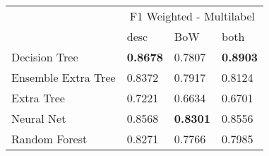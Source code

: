 \begin{tabular}{|l|l|l|l| }
\hline
 &  \multicolumn{3}{c|}{F1 Weighted - Multilabel} \\
\cline{2-4} & desc & BoW & both \\ \hline
Decision Tree       & {\bf 0.8678} & 0.7807 & {\bf 0.8903}\\
Ensemble Extra Tree & 0.8372 & 0.7917 & 0.8124\\
Extra Tree          & 0.7221 & 0.6634 & 0.6701\\
Neural Net          & 0.8568 & {\bf 0.8301} & 0.8556\\
Random Forest       & 0.8271 & 0.7766 & 0.7985\\
\hline
\end{tabular}
